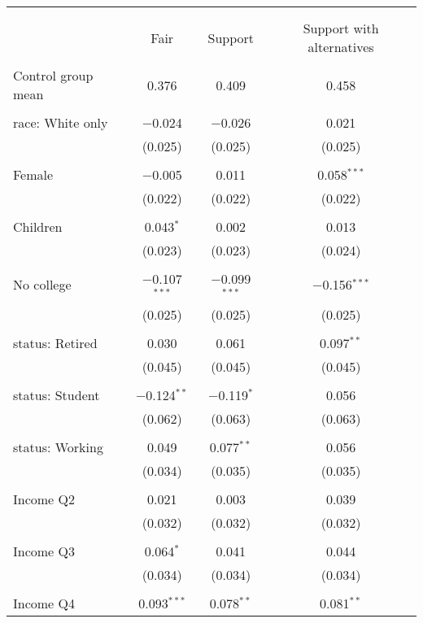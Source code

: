 
\begin{tabular}{@{\extracolsep{5pt}}lccc} 
\\[-1.8ex]\hline 
\hline \\[-1.8ex] 
\\[-1.8ex] & Fair & Support & Support with alternatives \\ 
\hline \\[-1.8ex] 
 Control group mean & 0.376 & 0.409 & 0.458  \\ \hline \\[-1.8ex] race: White only & $-$0.024 & $-$0.026 & 0.021 \\ 
  & (0.025) & (0.025) & (0.025) \\ 
  & & & \\ 
 Female & $-$0.005 & 0.011 & 0.058$^{***}$ \\ 
  & (0.022) & (0.022) & (0.022) \\ 
  & & & \\ 
 Children & 0.043$^{*}$ & 0.002 & 0.013 \\ 
  & (0.023) & (0.023) & (0.024) \\ 
  & & & \\ 
 No college & $-$0.107$^{***}$ & $-$0.099$^{***}$ & $-$0.156$^{***}$ \\ 
  & (0.025) & (0.025) & (0.025) \\ 
  & & & \\ 
 status: Retired & 0.030 & 0.061 & 0.097$^{**}$ \\ 
  & (0.045) & (0.045) & (0.045) \\ 
  & & & \\ 
 status: Student & $-$0.124$^{**}$ & $-$0.119$^{*}$ & 0.056 \\ 
  & (0.062) & (0.063) & (0.063) \\ 
  & & & \\ 
 status: Working & 0.049 & 0.077$^{**}$ & 0.056 \\ 
  & (0.034) & (0.035) & (0.035) \\ 
  & & & \\ 
 Income Q2 & 0.021 & 0.003 & 0.039 \\ 
  & (0.032) & (0.032) & (0.032) \\ 
  & & & \\ 
 Income Q3 & 0.064$^{*}$ & 0.041 & 0.044 \\ 
  & (0.034) & (0.034) & (0.034) \\ 
  & & & \\ 
 Income Q4 & 0.093$^{***}$ & 0.078$^{**}$ & 0.081$^{**}$ \\ 

\end{tabular}
